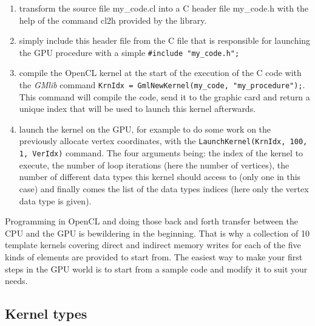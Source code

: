 \documentclass[a4paper,12pt]{article}
\begin{document}
\begin{enumerate}
\item transform the source file my\_code.cl into a C header file my\_code.h with the help of the command cl2h provided by the library.
\item simply include this header file from the C file that is responsible for launching the GPU procedure with a simple
 {\tt \#include "my\_code.h";}
\item compile the OpenCL kernel at the start of the execution of the C code with the \emph{GMlib} command {\tt KrnIdx = GmlNewKernel(my\_code, "my\_procedure");}. This command will compile the code, send it to the graphic card and return a unique index that will be used to launch this kernel afterwards.
\item launch the kernel on the GPU, for example to do some work on the previously allocate vertex coordinates, with the {\tt LaunchKernel(KrnIdx, 100, 1, VerIdx)} command. The four arguments being: the index of the kernel to execute, the number of loop iterations (here the number of vertices), the number of different data types this kernel should access to (only one in this case) and finally comes the list of the data types indices (here only the vertex data type is given).
\end{enumerate}

Programming in OpenCL and doing those back and forth transfer between the CPU and the GPU is bewildering in the beginning. That is why a collection of 10 template kernels covering direct and indirect memory writes for each of the five kinds of elements are provided to start from. The easiest way to make your first steps in the GPU world is to start from a sample code and modify it to suit your needs.

\subsection{Kernel types}
\end{document}
